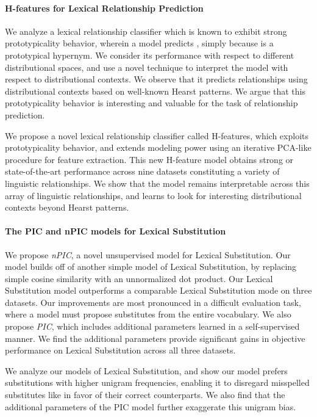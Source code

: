 \paragraph{H-features for Lexical Relationship Prediction}
We analyze a lexical relationship classifier which is known to exhibit
    strong prototypicality behavior, wherein a model predicts , simply because  is a prototypical
    hypernym. We consider its performance with respect to different
    distributional spaces, and use a novel technique to interpret the model
    with respect to distributional contexts. We observe that it predicts
    relationships using distributional contexts based on well-known Hearst
    patterns. We argue that this prototypicality behavior is interesting and
    valuable for the task of relationship prediction.

We propose a novel lexical relationship classifier called H-features,
    which exploits prototypicality behavior, and extends modeling power
    using an iterative PCA-like procedure for feature extraction. This new
    H-feature model obtains strong or state-of-the-art performance across
    nine datasets constituting a variety of linguistic relationships.
    We show that the model remains interpretable across this
    array of linguistic relationships, and learns to look for interesting
    distributional contexts beyond Hearst patterns.

\paragraph{The PIC and nPIC models for Lexical Substitution}
We propose {\em nPIC}, a novel unsupervised model for Lexical
    Substitution. Our model
    builds off of another simple model of Lexical Substitution, by replacing
    simple cosine similarity with an unnormalized dot product. Our Lexical
    Substitution model outperforms a comparable Lexical Substitution mode on
    three datasets. Our improvements are most pronounced in a difficult
    evaluation task, where a model must propose substitutes from the entire
    vocabulary.
    We also propose {\em PIC}, which includes additional parameters
    learned in a self-supervised manner. We find the additional parameters
    provide significant gains in objective performance on Lexical Substitution
    across all three datasets.

    We analyze our models of Lexical Substitution, and show our model
    prefers substitutions  with higher unigram frequencies, enabling it to
    disregard misspelled substitutes like  in favor of
    their correct counterparts. We also find that the additional parameters
    of the PIC model further exaggerate this unigram bias.

